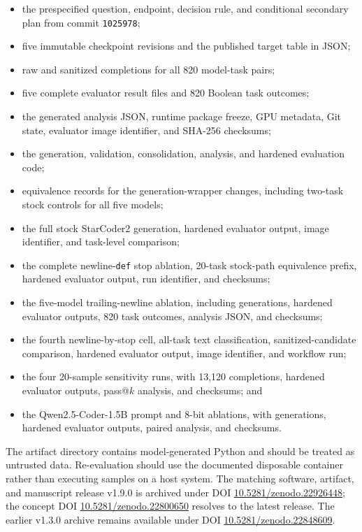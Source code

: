 \documentclass[10pt,twocolumn]{article}
\newcommand{\code}[1]{\texttt{#1}}
\begin{document}
\begin{itemize}
  \item the prespecified question, endpoint, decision rule, and conditional secondary plan from commit \code{1025978};
  \item five immutable checkpoint revisions and the published target table in JSON;
  \item raw and sanitized completions for all 820 model-task pairs;
  \item five complete evaluator result files and 820 Boolean task outcomes;
  \item the generated analysis JSON, runtime package freeze, GPU metadata, Git state, evaluator image identifier, and SHA-256 checksums;
  \item the generation, validation, consolidation, analysis, and hardened evaluation code;
  \item equivalence records for the generation-wrapper changes, including two-task stock controls for all five models;
  \item the full stock StarCoder2 generation, hardened evaluator output, image identifier, and task-level comparison;
  \item the complete newline-\code{def} stop ablation, 20-task stock-path equivalence prefix, hardened evaluator output, run identifier, and checksums;
  \item the five-model trailing-newline ablation, including generations, hardened evaluator outputs, 820 task outcomes, analysis JSON, and checksums;
  \item the fourth newline-by-stop cell, all-task text classification, sanitized-candidate comparison, hardened evaluator output, image identifier, and workflow run;
  \item the four 20-sample sensitivity runs, with 13,120 completions, hardened evaluator outputs, pass@$k$ analysis, and checksums; and
  \item the Qwen2.5-Coder-1.5B prompt and 8-bit ablations, with generations, hardened evaluator outputs, paired analysis, and checksums.
\end{itemize}

The artifact directory contains model-generated Python and should be treated as untrusted data. Re-evaluation should use the documented disposable container rather than executing samples on a host system. The matching software, artifact, and manuscript release v1.9.0 is archived under DOI \href{https://doi.org/10.5281/zenodo.22926448}{10.5281/zenodo.22926448}; the concept DOI \href{https://doi.org/10.5281/zenodo.22800650}{10.5281/zenodo.22800650} resolves to the latest release. The earlier v1.3.0 archive remains available under DOI \href{https://doi.org/10.5281/zenodo.22848609}{10.5281/zenodo.22848609}.
\end{document}

